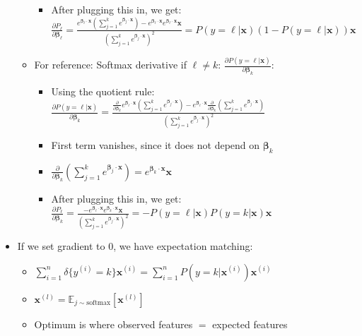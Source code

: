 \begin{itemize}
\begin{itemize}
\begin{itemize}
            \item After plugging this in, we get: $
            \frac{\partial P_\ell}{\partial \boldsymbol{\beta}_\ell} = \frac{e^{\boldsymbol{\beta}_\ell \cdot \boldsymbol{x}} ( \sum_{j=1}^k e^{\boldsymbol{\beta}_j \cdot \boldsymbol{x}} ) - e^{\boldsymbol{\beta}_\ell \cdot \boldsymbol{x}}  e^{\boldsymbol{\beta}_\ell \cdot \boldsymbol{x}} \boldsymbol{x}}{( \sum_{j=1}^k e^{\boldsymbol{\beta}_j \cdot \boldsymbol{x}} )^2} = P(y = \ell | \boldsymbol{x}) (1 - P(y = \ell | \boldsymbol{x})) \boldsymbol{x}
            $
        \end{itemize}
        \item For reference: Softmax derivative if $\ell \neq k$: $\frac{\partial P(y = \ell | \boldsymbol{x})}{\partial \boldsymbol{\beta}_k}$:
        \begin{itemize}
            \item Using the quotient rule:
            $
            \frac{\partial P(y = \ell | \boldsymbol{x})}{\partial \boldsymbol{\beta}_k} = \frac{\frac{\partial}{\partial \boldsymbol{\beta}_k} e^{\boldsymbol{\beta}_\ell \cdot \boldsymbol{x}} ( \sum_{j=1}^k e^{\boldsymbol{\beta}_j \cdot \boldsymbol{x}} ) - e^{\boldsymbol{\beta}_\ell \cdot \boldsymbol{x}} \frac{\partial}{\partial \boldsymbol{\beta}_k} ( \sum_{j=1}^k e^{\boldsymbol{\beta}_j \cdot \boldsymbol{x}} )}{( \sum_{j=1}^k e^{\boldsymbol{\beta}_j \cdot \boldsymbol{x}} )^2}
            $
            \item First term vanishes, since it does not depend on $\boldsymbol{\beta}_k$
            \item 
            $
            \frac{\partial}{\partial \boldsymbol{\beta}_k} ( \sum_{j=1}^k e^{\boldsymbol{\beta}_j \cdot \boldsymbol{x}} ) = e^{\boldsymbol{\beta}_k \cdot \boldsymbol{x}} \boldsymbol{x}
            $ 
            \item After plugging this in, we get: $
            \frac{\partial P_\ell}{\partial \boldsymbol{\beta}_k} = \frac{- e^{\boldsymbol{\beta}_\ell \cdot \boldsymbol{x}}  e^{\boldsymbol{\beta}_k \cdot \boldsymbol{x}} \boldsymbol{x}}{( \sum_{j=1}^k e^{\boldsymbol{\beta}_j \cdot \boldsymbol{x}} )^2} = -P(y = \ell | \boldsymbol{x}) P(y = k | \boldsymbol{x}) \boldsymbol{x}
            $
        \end{itemize}
    \end{itemize}
    \item If we set gradient to 0, we have expectation matching:
    \begin{itemize}
        \item $\sum_{i=1}^n \delta\{y^{(i)} = k\} \boldsymbol{x}^{(i)} = \sum_{i=1}^n P(y = k | \boldsymbol{x}^{(i)}) \boldsymbol{x}^{(i)}$
        \item $\boldsymbol{x}^{(l)} = \mathbb{E}_{j \sim \textrm{softmax}} [ \boldsymbol{x}^{(l)} ]$
        \item Optimum is where observed features $=$ expected features
    \end{itemize}
\end{itemize}

